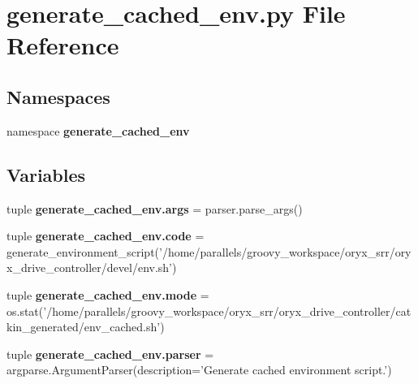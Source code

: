 \section{generate\-\_\-cached\-\_\-env.\-py \-File \-Reference}
\label{generate__cached__env_8py}
\subsection*{\-Namespaces}
\begin{DoxyCompactItemize}
\item 
namespace {\bf generate\-\_\-cached\-\_\-env}
\end{DoxyCompactItemize}
\subsection*{\-Variables}
\begin{DoxyCompactItemize}
\item 
tuple {\bf generate\-\_\-cached\-\_\-env.\-args} = parser.\-parse\-\_\-args()
\item 
tuple {\bf generate\-\_\-cached\-\_\-env.\-code} = generate\-\_\-environment\-\_\-script('/home/parallels/groovy\-\_\-workspace/oryx\-\_\-srr/oryx\-\_\-drive\-\_\-controller/devel/env.\-sh')
\item 
tuple {\bf generate\-\_\-cached\-\_\-env.\-mode} = os.\-stat('/home/parallels/groovy\-\_\-workspace/oryx\-\_\-srr/oryx\-\_\-drive\-\_\-controller/catkin\-\_\-generated/env\-\_\-cached.\-sh')
\item 
tuple {\bf generate\-\_\-cached\-\_\-env.\-parser} = argparse.\-Argument\-Parser(description='\-Generate cached environment script.')
\end{DoxyCompactItemize}
